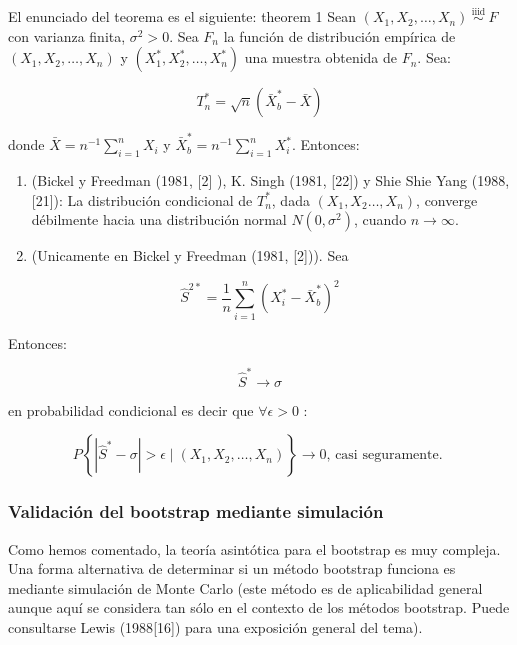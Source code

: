 \documentclass[
]{article}
\providecommand{\tightlist}{%
  \setlength{\itemsep}{0pt}\setlength{\parskip}{0pt}}
\begin{document}
El enunciado del teorema es el siguiente:
theorem 1 Sean \(\left(X_{1}, X_{2}, \ldots, X_{n}\right) \stackrel{\text { iiid }}{\sim} F\) con varianza finita, \(\sigma^{2}>0\). Sea \(F_{n}\) la función de distribución empírica de \(\left(X_{1}, X_{2}, \ldots, X_{n}\right)\) y \(\left(X_{1}^{*}, X_{2}^{*}, \ldots, X_{n}^{*}\right)\) una muestra obtenida de \(F_{n}\). Sea:

\[
T_{n}^{*}=\sqrt{n}\left(\bar{X}_{b}^{*}-\bar{X}\right)
\]

donde \(\bar{X}=n^{-1} \sum_{i=1}^{n} X_{i}\) y \(\bar{X}_{b}^{*}=n^{-1} \sum_{i=1}^{n} X_{i}^{*}\). Entonces:

\begin{enumerate}
\def\labelenumi{\arabic{enumi}.}
\tightlist
\item
  (Bickel y Freedman (1981, {[}2{]} ), K. Singh (1981, {[}22{]}) y Shie Shie Yang (1988, {[}21{]}): La distribución condicional de \(T_{n}^{*}\), dada \(\left(X_{1}, X_{2} \ldots, X_{n}\right)\), converge débilmente hacia una distribución normal \(N\left(0, \sigma^{2}\right)\), cuando \(n \rightarrow \infty\).
\item
  (Unicamente en Bickel y Freedman (1981, {[}2{]})). Sea
\end{enumerate}

\[
\hat{S}^{2 *}=\frac{1}{n} \sum_{i=1}^{n}\left(X_{i}^{*}-\bar{X}_{b}^{*}\right)^{2}
\]

Entonces:

\[
\hat{S}^{*} \rightarrow \sigma
\]

en probabilidad condicional es decir que \(\forall \epsilon>0\) :

\[
P\left\{\left|\hat{S}^{*}-\sigma\right|>\epsilon \mid\left(X_{1}, X_{2}, \ldots, X_{n}\right)\right\} \rightarrow 0 \text {, casi seguramente. }
\]

\subsubsection{Validación del bootstrap mediante simulación}\label{validaciuxf3n-del-bootstrap-mediante-simulaciuxf3n}

Como hemos comentado, la teoría asintótica para el bootstrap es muy compleja. Una forma alternativa de determinar si un método bootstrap funciona es mediante simulación de Monte Carlo (este método es de aplicabilidad general aunque aquí se considera tan sólo en el contexto de los métodos bootstrap. Puede consultarse Lewis (1988{[}16{]}) para una exposición general del tema).
\end{document}
